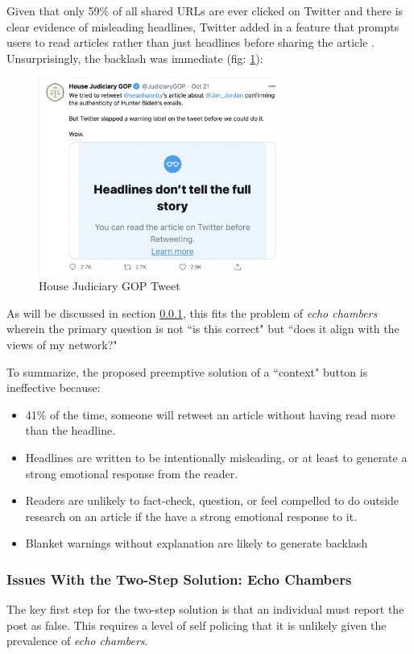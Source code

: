 \documentclass[preprint,review,12pt]{elsarticle}
\begin{document}
 
Given that only 59\% of all shared URLs are ever clicked on Twitter \cite{gabielkov2016social} and there is clear evidence of misleading headlines, Twitter added in a feature that prompts users to read articles rather than just headlines before sharing the article \cite{reuters2020article}. Unsurprisingly, the backlash was immediate (fig: \ref{fig:House Judiciary GOP Tweet}):
 \begin{figure}[htp]
    \centering
    \includegraphics[width=8cm]{JudiciaryTweet.png}
    \caption{House Judiciary GOP Tweet}
    \label{fig:House Judiciary GOP Tweet}
\end{figure}

As will be discussed in section \ref{sec: echo chambers}, this fits the problem of \textit{echo chambers} wherein the primary question is not ``is this correct" but ``does it align with the views of my network?" 

To summarize, the proposed preemptive solution of a ``context" button is ineffective because:
\begin{itemize}
\item 41\% of the time, someone will retweet an article without having read more than the headline. \cite{gabielkov2016social}
\item Headlines are written to be intentionally misleading, or at least to generate a strong emotional response from the reader.\cite{chesney2017incongruent}
\item Readers are unlikely to fact-check, question, or feel compelled to do outside research on an article if the have a strong emotional response to it.\cite{nyhan2010corrections}
\item Blanket warnings without explanation are likely to generate backlash \cite{reuters2020article}
 
 \end{itemize}

\subsubsection{Issues With the Two-Step Solution: Echo Chambers}
\label{sec: echo chambers}
 The key first step for the two-step solution is that an individual must report the post as false. This requires a level of self policing that it is unlikely given the prevalence of \textit{echo chambers}. 
 
\end{document}
